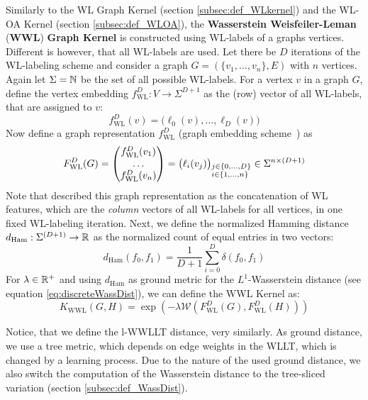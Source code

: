 		Similarly to the WL Graph Kernel (section  \ref{subsec:def_WLkernel}) and the WL-OA Kernel (section \ref{subsec:def_WLOA}), the \textbf{Wasserstein Weisfeiler-Leman} (\textbf{WWL}) \textbf{Graph Kernel} is constructed using WL-labels of a graphs vertices.
		Different is however, that all WL-labels are used.
		Let there be $D$ iterations of the WL-labeling scheme and consider a graph $G=(\{ v_1, \dots, v_n \}, E)$ with $n$ vertices.
		Again let $\Sigma=\mathbb{N}$ be the set of all possible WL-labels.
		For a vertex $v$ in a graph $G$, define the vertex embedding $f_{\text{WL}}^{D}:V\to\Sigma^{D+1}$ as the (row) vector of all WL-labels, that are assigned to $v$:		
		\[ f_{\text{WL}}^{D}(v) = \big( \ell_0(v), \dots, \ell_D(v) \big)  \]
		Now define a graph representation $f_{\text{WL}}^{D}$ (graph embedding scheme~\cite{2019_Togninalli_NIPS}) as 
		\[ F_{\text{WL}}^{D}(G) = \begin{pmatrix}
		f_{\text{WL}}^{D}(v_1) \\ \dots \\ f_{\text{WL}}^{D}(v_n)
		\end{pmatrix}  = \big( \ell_i(v_j) \big)_{\begin{subarray}{l}
			j\in\{0,\dots,D\}\\
			i\in\{1,\dots,n\}
			\end{subarray}} \in \Sigma^{n\times (D+1)} \]
		Note that \citeauthor{2019_Togninalli_NIPS} described this graph representation as the concatenation of WL features, which are the \textit{column} vectors of all WL-labels for all vertices, in one fixed WL-labeling iteration.
		Next, we define the normalized Hamming distance $d_{\text{Ham}}: \Sigma^{(D+1)} \to \mathbb{R}$ as the normalized count of equal entries in two vectors:
		\[ d_{\text{Ham}}(f_0, f_1) = \frac{1}{D+1} \sum\limits_{i=0}^{D} \delta(f_0, f_1) \]		
		For $\lambda\in \mathbb{R}^+$ and using $d_{\text{Ham}}$ as ground metric for the $L^1$-Wasserstein distance (see equation \ref{eq:discreteWassDist}), we can define the WWL Kernel as:		
		\begin{equation} \label{eq:WWLKernel}
			K_{\text{WWL}}(G,H) = \exp(-\lambda \mathcal{W}(F_{\text{WL}}^{D}(G), F_{\text{WL}}^{D}(H)) )
		\end{equation}
		
		Notice, that we define the l-WWLLT distance, very similarly. 
		As ground distance, we use a tree metric, which depends on edge weights in the WLLT, which is changed by a learning process.
		Due to the nature of the used ground distance, we also switch the computation of the Wasserstein distance to the tree-sliced variation (section \ref{subsec:def_WassDist}).

